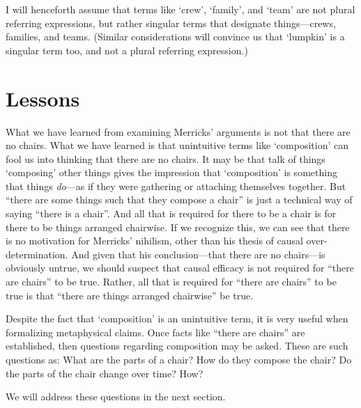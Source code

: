 \documentclass[11pt]{article}
\begin{document}
\begin{spacing}{1.25}
I will henceforth assume that terms like `crew', `family', and `team'
are not plural referring expressions, but rather singular terms that
designate things---crews, families, and teams.  (Similar
considerations will convince us that `lumpkin' is a singular term too,
and not a plural referring expression.)

\section{Lessons}
What we have learned from examining Merricks' arguments is not that
there are no chairs.  What we have learned is that unintuitive terms
like `composition' can fool us into thinking that there are no chairs.
It may be that talk of things `composing' other things gives the
impression that `composition' is something that things {\em do}---as
if they were gathering or attaching themselves together.  But ``there
are some things such that they compose a chair'' is just a technical
way of saying ``there is a chair''.  And all that is required for
there to be a chair is for there to be things arranged chairwise.  If
we recognize this, we can see that there is no motivation for
Merricks' nihilism, other than his thesis of causal
over-determination.  And given that his conclusion---that there are no
chairs---is obviously untrue, we should suspect that causal efficacy
is not required for ``there are chairs'' to be true.  Rather, all that
is required for ``there are chairs'' to be true is that ``there are
things arranged chairwise'' be true.

Despite the fact that `composition' is an unintuitive term, it is very
useful when formalizing metaphysical claims.  Once facts like ``there
are chairs'' are established, then questions regarding composition may
be asked.  These are such questions as: What are the parts of a chair?
How do they compose the chair?  Do the parts of the chair change over
time?  How?

We will address these questions in the next section.
\ifstandalone
\end{spacing}


\fi
\end{document}

